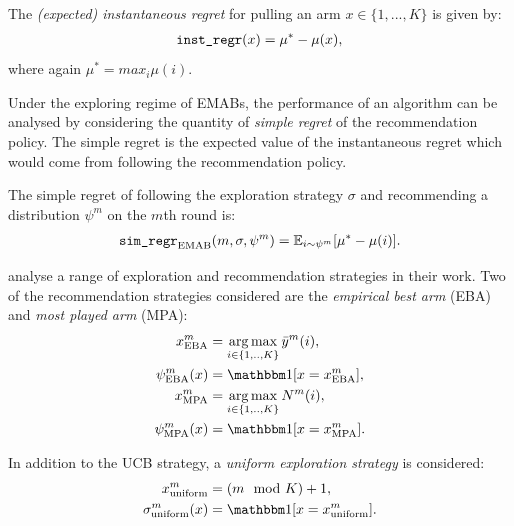         The \textit{(expected) instantaneous regret} for pulling an arm $x\in\{1,...,K\}$ is given by:
        \begin{align}
            {\textnormal{\texttt{inst\_regr}}}(x) = \mu^* - \mu(x), \label{eq:2:instantaneous_regret_def}
        \end{align}
        where again $\mu^* = max_i \mu(i)$.
        
        Under the exploring regime of EMABs, the performance of an algorithm can be analysed by considering the quantity of \textit{simple regret} of the recommendation policy. The simple regret is the expected value of the instantaneous regret which would come from following the recommendation policy.

        \begin{defn}
            \label{def:2:simple_regret}
            The \textnormal{simple regret} of following the exploration strategy $\sigma$ and recommending a distribution $\psi^m$ on the $m$th round is:
            \begin{align}
                {\textnormal{\texttt{sim\_regr}}}_{{\textnormal{EMAB}}}(m,\sigma,\psi^m) = \mathbb{E}_{i\sim\psi^m}[\mu^* - \mu(i)]. \label{eq:2:simple_regret_def}
            \end{align}
        \end{defn}

        \citet{exploring_bandit} analyse a range of exploration and recommendation strategies in their work. Two of the recommendation strategies considered are the \textit{empirical best arm} (EBA) and \textit{most played arm} (MPA):
        \begin{align}
            x^m_{\eba} &= \argmax_{i\in\{1,..,K\}} \bar{y}^m(i), \label{eq:2:eba_arm} \\
            \psi^m_{\eba}(x) &= \one[x=x^m_{\eba}], \label{eq:2:eba_recommendation_strategy} \\
            x^m_{\mpa} &= \argmax_{i\in\{1,..,K\}} N^m(i), \label{eq:2:mpa_arm} \\
            \psi^m_{\mpa}(x) &= \one[x=x^m_{\mpa}]. \label{eq:2:mpa_recommendation_strategy} 
        \end{align}

        In addition to the UCB strategy, a \textit{uniform exploration strategy} is considered:
        \begin{align}
            x^m_{\uniform} &= \left(m\mod K\right)+1, \label{eq:2:uniform} \\
            \sigma^m_{\uniform}(x) &= \one[x=x^m_{\uniform}]. \label{eq:2:uniform_strategy}
        \end{align}

